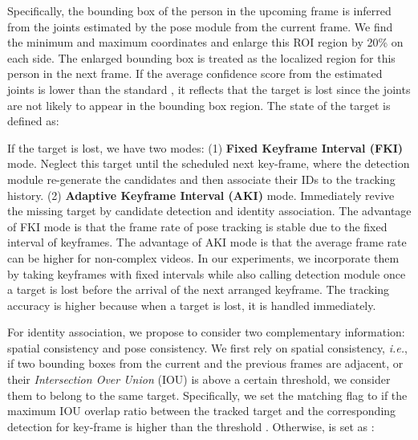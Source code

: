 \documentclass[10pt,twocolumn,letterpaper]{article}
\begin{document}
	Specifically, the bounding box of the person in the upcoming frame is inferred from the joints estimated by the pose module from the current frame. We find the minimum and maximum coordinates and enlarge this ROI region by 20\% on each side. The enlarged bounding box is treated as the localized region for this person in the next frame. 
	If the average confidence score  from the estimated joints is lower than the standard , it reflects that the target is lost since the joints are not likely to appear in the bounding box region. 
	The state of the target is defined as:
	
	If the target is lost, we have two modes: (1) \textbf{Fixed Keyframe Interval (FKI)} mode. Neglect this target until the scheduled next key-frame, where the detection module re-generate the candidates and then associate their IDs to the tracking history. (2) \textbf{Adaptive Keyframe Interval (AKI)} mode. Immediately revive the missing target by candidate detection and identity association. 
	The advantage of FKI mode is that the frame rate of pose tracking is stable due to the fixed interval of keyframes. The advantage of AKI mode is that the average frame rate can be higher for non-complex videos.
	In our experiments, we incorporate them by taking keyframes with fixed intervals while also calling detection module once a target is lost before the arrival of the next arranged keyframe.
	The tracking accuracy is higher because when a target is lost, it is handled immediately. 

	For identity association, we propose to consider two complementary information: spatial consistency and pose consistency. We first rely on spatial consistency, \emph{i.e.}, if two bounding boxes from the current and the previous frames are adjacent, or their \textit{Intersection Over Union} (IOU) is above a certain threshold, we consider them to belong to the same target. 
	Specifically, we set the matching flag  to  if the maximum IOU overlap ratio  between the tracked target  and the corresponding detection  for key-frame  is higher than the threshold . Otherwise,  is set as :
	
\end{document}
